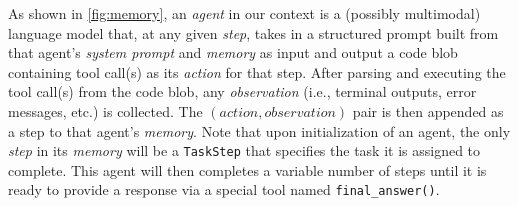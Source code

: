 \documentclass{article}
\begin{document}
As shown in \cref{fig:memory}, an \textit{agent} in our context is a (possibly multimodal) language model that, at any given \textit{step}, takes in a structured prompt built from that agent's \textit{system prompt} and \textit{memory} as input and output a code blob containing tool call(s) as its \textit{action} for that step. After parsing and executing the tool call(s) from the code blob, any \textit{observation} (i.e., terminal outputs, error messages, etc.) is collected. The $(action, observation)$ pair is then appended as a step to that agent's \textit{memory}. Note that upon initialization of an agent, the only \textit{step} in its \textit{memory} will be a \texttt{TaskStep} that specifies the task it is assigned to complete. This agent will then completes a variable number of steps until it is ready to provide a response via a special tool named \texttt{final\_answer()}.
\end{document}
